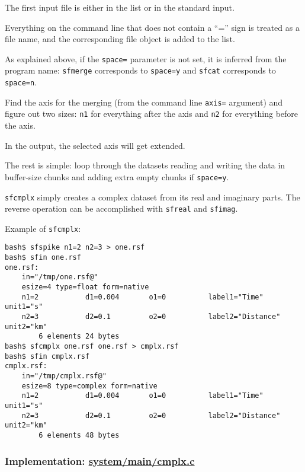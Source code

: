 The first input file is either in the list or in the standard input.

Everything on the command line that does not contain a ``='' sign is
treated as a file name, and the corresponding file object is added to the list.

As explained above, if the \texttt{space=} parameter is not set, it is
inferred from the program name: \texttt{sfmerge} corresponds to
\texttt{space=y} and \texttt{sfcat} corresponds to \texttt{space=n}.

Find the axis for the merging (from the command line \texttt{axis=}
argument) and figure out two sizes: \texttt{n1} for everything after
the axis and \texttt{n2} for everything before the axis.

In the output, the selected axis will get extended.

The rest is simple: loop through the datasets reading and writing the
data in buffer-size chunks and adding extra empty chunks if
\texttt{space=y}.

\noindent\doublebox{\parbox{\textwidth}{

}}

\texttt{sfcmplx} simply creates a complex dataset from its real and
imaginary parts. The reverse operation can be accomplished with
\texttt{sfreal} and \texttt{sfimag}.

Example of \texttt{sfcmplx}:
\begin{verbatim}
bash$ sfspike n1=2 n2=3 > one.rsf
bash$ sfin one.rsf
one.rsf:
    in="/tmp/one.rsf@"
    esize=4 type=float form=native
    n1=2           d1=0.004       o1=0          label1="Time" unit1="s"
    n2=3           d2=0.1         o2=0          label2="Distance" unit2="km"
        6 elements 24 bytes
bash$ sfcmplx one.rsf one.rsf > cmplx.rsf
bash$ sfin cmplx.rsf
cmplx.rsf:
    in="/tmp/cmplx.rsf@"
    esize=8 type=complex form=native
    n1=2           d1=0.004       o1=0          label1="Time" unit1="s"
    n2=3           d2=0.1         o2=0          label2="Distance" unit2="km"
        6 elements 48 bytes
\end{verbatim}

\subsubsection{Implementation: \href{http://rsf.svn.sourceforge.net/viewvc/rsf/trunk/system/main/cmplx.c?view=markup}{system/main/cmplx.c}}

